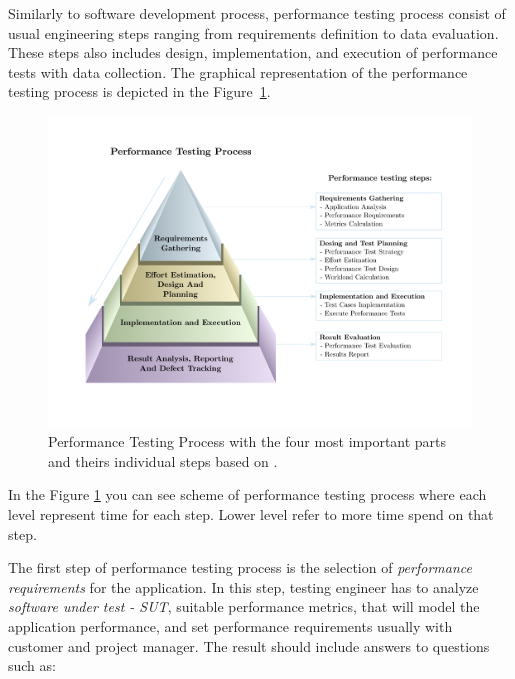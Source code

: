 
Similarly to software development process, performance testing process consist of usual engineering steps ranging from requirements definition to data evaluation. These steps also includes design, implementation, and execution of performance tests with data collection. The graphical representation of the performance testing process is depicted in the Figure~\ref{fig:performace_testing_process}.

\begin{figure}[H]
  \includegraphics[width=16cm]{obrazky-figures/pyramid.pdf}
  \captionsetup{justification=centering}
  \caption{Performance Testing Process with the four most important parts and theirs individual steps based on \cite{Sharma:HP}.}
  \label{fig:performace_testing_process}
\end{figure}
In the Figure \ref{fig:performace_testing_process} you can see scheme of performance testing process where each level represent time for each step. Lower level refer to more time spend on that step.

The first step of performance testing process is the selection of \emph{performance requirements} for the application. In this step, testing engineer has to analyze \emph{software under test - SUT}, suitable performance metrics, that will model the application performance, and set performance requirements usually with customer and project manager. The result should include answers to questions such as:

